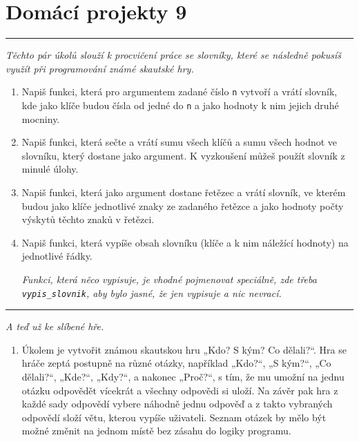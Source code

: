 \documentclass[a4paper,10pt]{article}
\newcommand\plsetno{9}
\newcommand\startsection[1]{
     \vspace{0.2ex}
    \hrule
    {\fontspec{Oxygen} \tiny
     \vspace{-1ex}
     \emph{#1}
     \vspace{-1.5em}
    }
}
\begin{document}
\section*{Domácí projekty \plsetno}

\startsection{Těchto pár úkolů slouží k procvičení práce se slovníky, které se
    následně pokusíš využít při programování známé skautské hry.}

\begin{enumerate}

\item Napiš funkci, která pro argumentem zadané číslo \texttt{n} vytvoří a vrátí slovník,
    kde jako klíče budou čísla od jedné do \texttt{n} a jako hodnoty k nim
    jejich druhé mocniny.

\item Napiš funkci, která sečte a vrátí sumu všech klíčů a sumu všech hodnot
    ve slovníku, který dostane jako argument. K vyzkoušení můžeš použít
    slovník z minulé úlohy.

\item Napiš funkci, která jako argument dostane řetězec a vrátí slovník,
    ve kterém budou jako klíče jednotlivé znaky ze zadaného řetězce a jako
    hodnoty počty výskytů těchto znaků v řetězci.

\item Napiš funkci, která vypíše obsah slovníku (klíče a k nim náležící
    hodnoty) na jednotlivé řádky.

    \emph{Funkci, která něco vypisuje, je vhodné
    pojmenovat speciálně, zde třeba \texttt{vypis\_slovnik}, aby bylo jasné,
    že jen vypisuje a nic nevrací.}

\end{enumerate}

\startsection{A teď už ke slíbené hře.}

\begin{enumerate}[resume]

\item Úkolem je vytvořit známou skautskou hru „Kdo? S kým? Co dělali?“. Hra se
    hráče zeptá postupně na různé otázky, například „Kdo?“, „S kým?“,
    „Co dělali?“, „Kde?“, „Kdy?“, a nakonec „Proč?“, s tím, že mu umožní
    na jednu otázku odpovědět vícekrát a všechny odpovědi si uloží.
    Na závěr pak hra z každé sady odpovědí vybere náhodně jednu odpověď
    a z takto vybraných odpovědí složí větu, kterou vypíše uživateli.
    Seznam otázek by mělo být možné změnit na jednom místě bez zásahu
    do logiky programu.

\end{enumerate}
\end{document}
